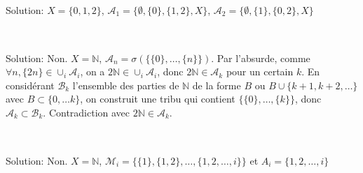 \documentclass{report}
\begin{document}
Solution: $X=\{0,1,2\}$, $\mathcal A_1=\{\emptyset, \{0\}, \{1,2\}, X\}$, $\mathcal A_2=\{\emptyset, \{1\}, \{0,2\}, X\}$

\subsection{}  \\

Solution: Non. $X=\mathbb N$, $\mathcal A_n=\sigma(\{\{0\}, \ldots, \{n\}\})$. Par l'absurde, comme $\forall n, \{2n\}\in \cup_i \mathcal A_i$, on a $2\mathbb N \in \cup_i \mathcal A_i$, donc $2\mathbb N \in \mathcal A_{k}$ pour un certain $k$. En considérant $\mathcal B_k$ l'ensemble des parties de $\mathbb N$ de la forme $B$ ou $B\cup \{k+1,k+2,\ldots\}$ avec $B\subset \{0,\ldots k\}$, on construit une tribu qui contient $\{\{0\},\ldots, \{k\}\}$, donc $\mathcal A_k \subset \mathcal B_k$. Contradiction avec $2\mathbb N \in \mathcal A_{k}$.

\subsection{}   \\

Solution: Non. $X=\mathbb N$, $\mathcal M_i = \{\{1\}, \{1,2\}, \ldots, \{1,2,\ldots, i\}\}$ et $A_i=\{1,2,\ldots, i\}$

\subsection{}  

\subsection{}  \\
\end{document}
